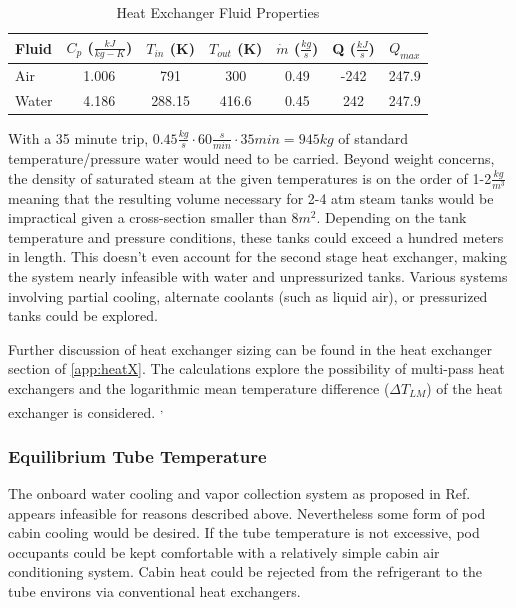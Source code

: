 \documentclass[heading.tex]{subfiles}
\begin{document}

\begin{table}
    \centering
    \caption{Heat Exchanger Fluid Properties}
    \label{tab:HeatEx}
    \begin{tabular}{l  c  c  c  c  c  c} 
        \hline
        Fluid & $C_{p}$ ($\frac{kJ}{kg-K}$)& $T_{in}$ (K) & $T_{out}$ (K) & $\dot{m}$ ($\frac{kg}{s}$) & Q ($\frac{kJ}{s}$) & $Q_{max}$\\ \hline 
        Air & 1.006 & 791 & 300 & 0.49 & -242 & 247.9\\ 
        Water & 4.186 & 288.15 & 416.6 &0.45 & 242 & 247.9\\ \hline
    \end{tabular}
\end{table}

With a 35 minute trip, $0.45 \frac{kg}{s} \cdot 60 \frac{s}{min} \cdot 35min = 945 kg$
of standard temperature/pressure water would need to be carried.
Beyond weight concerns, the density of saturated steam at the given temperatures is on the order of 1-2$\frac{kg}{m^{3}}$
meaning that the resulting volume necessary for 2-4 atm
steam tanks would be impractical given a cross-section smaller than 8$m^{2}$.
Depending on the tank temperature and pressure conditions, these tanks could exceed a hundred meters in length.
This doesn't even account for the second stage heat exchanger,
making the system nearly infeasible with water and unpressurized tanks.
Various systems involving partial cooling, alternate coolants (such as liquid air), or pressurized tanks could be explored.

Further discussion of heat exchanger sizing can be found in the heat exchanger section of \cref{app:heatX}.
The calculations explore the possibility of multi-pass heat exchangers
and the logarithmic mean temperature difference (${\Delta}T_{LM}$) of the heat exchanger is considered.
\cite{Cengal}\textsuperscript{,}
\cite{Turns}


\subsubsection{Equilibrium Tube Temperature}

The onboard water cooling and vapor collection system as proposed in Ref. 
appears infeasible for reasons described above.
Nevertheless some form of pod cabin cooling would be desired. 
If the tube temperature is not excessive,
pod occupants could be kept comfortable with a relatively simple cabin air conditioning system.
Cabin heat could be rejected from the refrigerant to the tube environs via conventional heat
exchangers.
\end{document}
